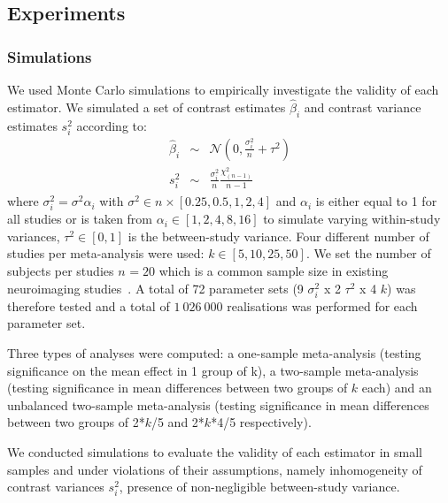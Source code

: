 \documentclass[preprint]{elsarticle}
\newcommand{\effectvector}{\hat\beta}
\newcommand{\effect}[1][i]{\effectvector_{#1}}
\newcommand{\vareffect}[1][i]{s^2_{#1}}
\newcommand{\nStudies}{k}
\newcommand{\varBetween}{\tau^2}
\newcommand{\sampleSize}[1][i]{n_{#1}}
\newcommand{\varWithin}[1][i]{\sigma^2_{#1}}
\begin{document}
\subsection{Experiments}

\subsubsection{Simulations}
We used Monte Carlo simulations to empirically investigate the validity of each estimator. We simulated a set of  contrast estimates $\effect$ and contrast variance estimates $\vareffect$ according to:
\begin{eqnarray}
	\effect &\sim& \mathcal{N}(0, \frac{\varWithin}{\sampleSize[]}+\varBetween) \\
	\vareffect &\sim& \frac{\varWithin}{\sampleSize[]}  \frac{\chi^2_{(\sampleSize[]-1)}}{\sampleSize[]-1} %
\end{eqnarray}
where $\varWithin = \varWithin[] \alpha_i$ with $\varWithin[] \in \sampleSize[] \times [0.25, 0.5, 1, 2, 4]$ and $\alpha_i$ is either equal to 1 for all studies or is taken from $\alpha_i \in [1, 2, 4, 8, 16]$ to simulate varying within-study variances, $\varBetween \in [0, 1]$ is the between-study variance. Four different number of studies per meta-analysis were used: $\nStudies \in [5, 10, 25, 50]$. We set the number of subjects per studies $\sampleSize[]=20$ which is a common sample size in existing neuroimaging studies~\cite{Poldrack2017}. A total of 72 parameter sets (9 $\varWithin$ x 2 $\varBetween$ x 4 $\nStudies$) was therefore tested and a total of $1~026~000$ realisations was performed for each parameter set.

Three types of analyses were computed: a one-sample meta-analysis (testing significance on the mean effect in 1 group of \nStudies), a two-sample meta-analysis (testing significance in mean differences between two groups of $\nStudies$ each) and an unbalanced two-sample meta-analysis (testing significance in mean differences between two groups of 2*$\nStudies$/5 and 2*$\nStudies$*4/5 respectively).

We conducted simulations to evaluate the validity of each estimator in small samples and under violations of their assumptions, namely inhomogeneity of contrast variances $\vareffect$, presence of non-negligible between-study variance.
\end{document}
